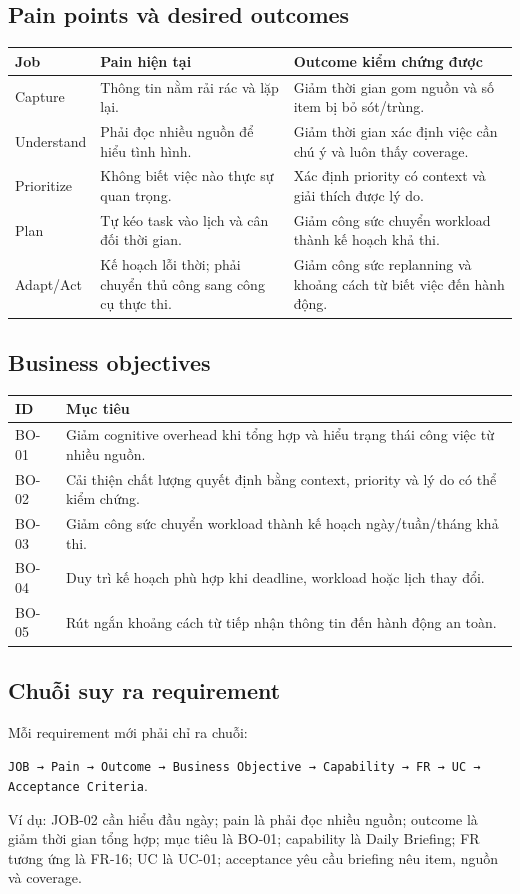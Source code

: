 \documentclass[12pt,a4paper]{article}
\begin{document}
\subsection{Pain points và desired outcomes}
\begin{longtable}{p{3cm}p{5.4cm}p{5.6cm}}
\toprule Job & Pain hiện tại & Outcome kiểm chứng được \\ \midrule
\endhead
Capture & Thông tin nằm rải rác và lặp lại. & Giảm thời gian gom nguồn và số item bị bỏ sót/trùng. \\
Understand & Phải đọc nhiều nguồn để hiểu tình hình. & Giảm thời gian xác định việc cần chú ý và luôn thấy coverage. \\
Prioritize & Không biết việc nào thực sự quan trọng. & Xác định priority có context và giải thích được lý do. \\
Plan & Tự kéo task vào lịch và cân đối thời gian. & Giảm công sức chuyển workload thành kế hoạch khả thi. \\
Adapt/Act & Kế hoạch lỗi thời; phải chuyển thủ công sang công cụ thực thi. & Giảm công sức replanning và khoảng cách từ biết việc đến hành động. \\
\bottomrule
\end{longtable}

\subsection{Business objectives}
\begin{longtable}{p{3.5cm}p{10.5cm}}
\toprule ID & Mục tiêu \\ \midrule
\endhead
BO-01 & Giảm cognitive overhead khi tổng hợp và hiểu trạng thái công việc từ nhiều nguồn. \\
BO-02 & Cải thiện chất lượng quyết định bằng context, priority và lý do có thể kiểm chứng. \\
BO-03 & Giảm công sức chuyển workload thành kế hoạch ngày/tuần/tháng khả thi. \\
BO-04 & Duy trì kế hoạch phù hợp khi deadline, workload hoặc lịch thay đổi. \\
BO-05 & Rút ngắn khoảng cách từ tiếp nhận thông tin đến hành động an toàn. \\
\bottomrule
\end{longtable}

\subsection{Chuỗi suy ra requirement}
Mỗi requirement mới phải chỉ ra chuỗi:
\begin{center}
\texttt{JOB → Pain → Outcome → Business Objective → Capability → FR → UC → Acceptance Criteria}.
\end{center}
Ví dụ: JOB-02 cần hiểu đầu ngày; pain là phải đọc nhiều nguồn; outcome là giảm
thời gian tổng hợp; mục tiêu là BO-01; capability là Daily Briefing; FR tương ứng
là FR-16; UC là UC-01; acceptance yêu cầu briefing nêu item, nguồn và coverage.
\end{document}
